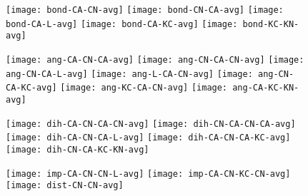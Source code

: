 \documentclass{article}
\begin{document}
\begin{figure}
  \begin{center}
    \begin{minipage}[t]{1.0\textwidth}
      \texttt{[image: bond-CA-CN-avg]}
      \texttt{[image: bond-CN-CA-avg]}
      \texttt{[image: bond-CA-L-avg]}
      \texttt{[image: bond-CA-KC-avg]}
      \texttt{[image: bond-KC-KN-avg]}
    \end{minipage}
  \end{center}
\end{figure}

\begin{figure}
  \begin{center}
    \begin{minipage}[t]{1.0\textwidth}
      \texttt{[image: ang-CA-CN-CA-avg]}
      \texttt{[image: ang-CN-CA-CN-avg]}
      \texttt{[image: ang-CN-CA-L-avg]}
      \texttt{[image: ang-L-CA-CN-avg]}
      \texttt{[image: ang-CN-CA-KC-avg]}
      \texttt{[image: ang-KC-CA-CN-avg]}
      \texttt{[image: ang-CA-KC-KN-avg]}
    \end{minipage}
  \end{center}
\end{figure}

\begin{figure}
  \begin{center}
    \begin{minipage}[t]{1.0\textwidth}
      \texttt{[image: dih-CA-CN-CA-CN-avg]}
      \texttt{[image: dih-CN-CA-CN-CA-avg]}
      \texttt{[image: dih-CA-CN-CA-L-avg]}
      \texttt{[image: dih-CA-CN-CA-KC-avg]}
      \texttt{[image: dih-CN-CA-KC-KN-avg]}
    \end{minipage}
  \end{center}
\end{figure}

\begin{figure}
  \begin{center}
    \begin{minipage}[t]{1.0\textwidth}
      \texttt{[image: imp-CA-CN-CN-L-avg]}
      \texttt{[image: imp-CA-CN-KC-CN-avg]}
      \texttt{[image: dist-CN-CN-avg]}
    \end{minipage}
  \end{center}
\end{figure}
\end{document}
